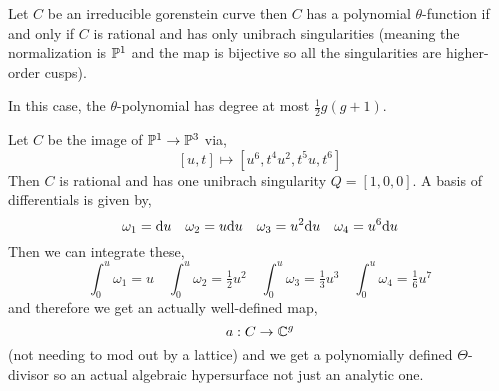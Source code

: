 \documentclass[12pt]{article}
\begin{document}
\begin{theorem}
Let $C$ be an irreducible gorenstein curve then $C$ has a polynomial $\theta$-function if and only if $C$ is rational and has only unibrach singularities (meaning the normalization is $\P^1$ and the map is bijective so all the singularities are higher-order cusps).  
\end{theorem}

\begin{rmk}
In this case, the $\theta$-polynomial has degree at most $\tfrac{1}{2} g(g+1)$. 
\end{rmk}

\begin{example}
Let $C$ be the image of $\P^1 \to \P^3$ via,
\[ [u,t] \mapsto [u^6, t^4 u^2, t^5 u, t^6] \]
Then $C$ is rational and has one unibrach singularity $Q = [1, 0, 0]$. A basis of differentials is given by,
\[ \omega_1 = \d{u} \quad \omega_2 = u \d{u} \quad \omega_3 = u^2 \d{u} \quad \omega_4 = u^6 \d{u} \]
Then we can integrate these,
\[ \int_0^u \omega_1 = u \quad \int_0^u \omega_2 = \tfrac{1}{2} u^2 \quad \int_0^u \omega_3 = \tfrac{1}{3} u^3 \quad \int_0^u \omega_4 = \tfrac{1}{6} u^7 \]
and therefore we get an actually well-defined map,
\[ a : C \to \CC^g \]
(not needing to mod out by a lattice) and we get a polynomially defined $\Theta$-divisor so an actual algebraic hypersurface not just an analytic one. 
\end{example}
\end{document}
